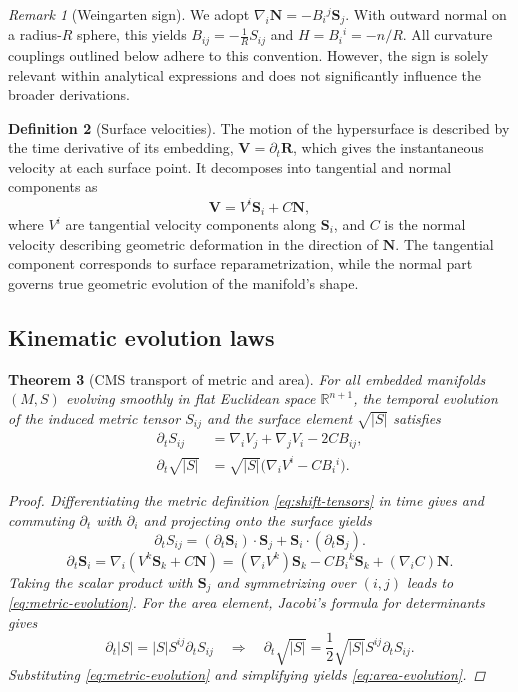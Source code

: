 \documentclass[11pt]{article}
\newcommand{\bS}{\mathbf{S}}
\newcommand{\bN}{\mathbf{N}}
\theoremstyle{definition}
\newtheorem{definition}{Definition}[section]
\theoremstyle{plain}
\newtheorem{theorem}[definition]{Theorem}
\theoremstyle{remark}
\newtheorem{remark}[definition]{Remark}
\begin{document}
\begin{remark}[Weingarten sign]\label{rem:weingarten-sign}
We adopt $\nabla_i \bN = - B_i{}^{j}\bS_j$. 
With outward normal on a radius-$R$ sphere, this yields $B_{ij}=-\frac{1}{R}S_{ij}$ and $H=B_i{}^{i}=-n/R$. All curvature couplings outlined below adhere to this convention. However, the sign is solely relevant within analytical expressions and does not significantly influence the broader derivations. 
\end{remark}

\begin{definition}[Surface velocities]\label{def:velocities}
The motion of the hypersurface is described by the time derivative of its embedding,
$\mathbf{V}=\partial_t \mathbf{R}$,
which gives the instantaneous velocity at each surface point.  
It decomposes into tangential and normal components as
\begin{equation}\label{eq:velocity-decomp}
\mathbf{V}=V^i\mathbf{S}_i + C\mathbf{N},
\end{equation}
where $V^i$ are tangential velocity components along $\mathbf{S}_i$, and $C$ is the normal velocity describing geometric deformation in the direction of $\mathbf{N}$.  
The tangential component corresponds to surface reparametrization, while the normal part governs true geometric evolution of the manifold’s shape.
\end{definition}

\subsection{Kinematic evolution laws}

\begin{theorem}[CMS transport of metric and area]\label{thm:metric-evolution} 
For all embedded manifolds $(M,S)$ evolving smoothly in flat Euclidean space $\mathbb{R}^{n+1}$, the temporal evolution of the induced metric tensor $S_{ij}$ and the surface element $\sqrt{|S|}$ satisfies
\begin{align}
\partial_t S_{ij}&=\nabla_i V_j+\nabla_j V_i-2C B_{ij},\label{eq:metric-evolution}\\
\partial_t \sqrt{|S|}&=\sqrt{|S|} \bigl(\nabla_i V^{i}-C B_{i}{}^{i}\bigr).\label{eq:area-evolution}
\end{align}
\begin{proof}
Differentiating the metric definition \eqref{eq:shift-tensors} in time gives and commuting $\partial_t$ with $\partial_i$ and projecting onto the surface yields
\[
\partial_t S_{ij} = (\partial_t \bS_i)\cdot\bS_j + \bS_i\cdot(\partial_t \bS_j).
\]
\[
\partial_t \bS_i = \nabla_i (V^k\bS_k + C\bN)
= (\nabla_i V^k)\bS_k - CB_i{}^{k}\bS_k + (\nabla_i C)\bN.
\]
Taking the scalar product with $\bS_j$ and symmetrizing over $(i,j)$ leads to
\eqref{eq:metric-evolution}. For the area element, Jacobi’s formula for determinants gives
\[
\partial_t |S| = |S| S^{ij} \partial_t S_{ij}
\quad\Rightarrow\quad
\partial_t \sqrt{|S|} = \frac{1}{2}\sqrt{|S|} S^{ij} \partial_t S_{ij}.
\]
Substituting \eqref{eq:metric-evolution} and simplifying yields \eqref{eq:area-evolution}.
\end{proof}
\end{theorem}
\end{document}
